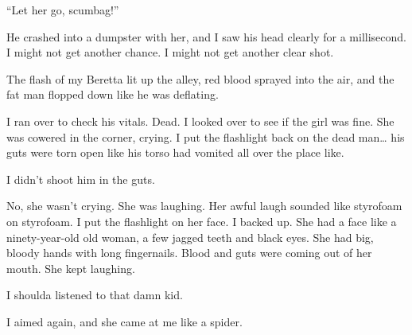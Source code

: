 ``Let her go, scumbag!''



He crashed into a dumpster with her, and I saw his head clearly for
a millisecond. I might not get another chance. I might not get
another clear shot.



The flash of my Beretta lit up the alley, red blood sprayed into
the air, and the fat man flopped down like he was deflating.



I ran over to check his vitals. Dead. I looked over to see if the
girl was fine. She was cowered in the corner, crying. I put the
flashlight back on the dead man{\ldots} his guts were torn open like his
torso had vomited all over the place like.



I didn't shoot him in the guts.



No, she wasn't crying. She was laughing. Her awful laugh
sounded like styrofoam on styrofoam. I put the flashlight on her
face. I backed up. She had a face like a ninety-year-old old woman,
a few jagged teeth and black eyes. She had big, bloody hands with
long fingernails. Blood and guts were coming out of her mouth. She
kept laughing.



I shoulda listened to that damn kid.



I aimed again, and she came at me like a spider.


 



